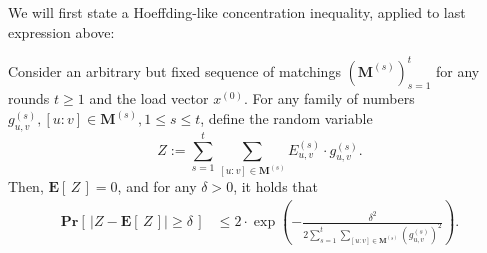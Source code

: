 \documentclass[twoside,leqno]{article}
\newcommand{\Pro}[1]{\mathbf{Pr} \left[\,#1\,\right]}
\newcommand{\Ex}[1]{\mathbf{E} \left[\,#1\,\right]}
\newcommand{\M}{\mathbf{M}}
\DeclareMathOperator{\1}{\mathbf{1}}
\numberwithin{equation}{section}
\begin{document}
We will first state a Hoeffding-like concentration inequality, applied to last expression above:
\begin{lemma}\label{lem:ss12chernoff}
Consider an arbitrary but fixed sequence of matchings  $(\M^{(s)})_{s=1}^{t}$ for any rounds $t \geq 1$ and the 
load vector $x^{(0)}$. For any family of numbers $g_{u,v}^{(s)}, [u:v] \in \M^{(s)}, 1 \leq s \leq t$, define the random variable
\[
 Z := \sum_{s=1}^{t} \sum_{[u:v] \in \M^{(s)}} E_{u,v}^{(s)} \cdot g_{u,v}^{(s)}.
\]
Then, $\Ex{Z}=0$, and for any $\delta>0$, it holds that
\begin{align*}
 \Pro{ \left| Z - \Ex{Z} \right| \geq \delta } &\leq 2 \cdot \exp\left( - \frac{ \delta^2 }{ 2 \sum_{s=1}^{t} \sum_{[u:v] \in \M^{(s)}} \left( g_{u,v}^{(s)} \right)^2 }  \right).
\end{align*}
\end{lemma}
\end{document}
